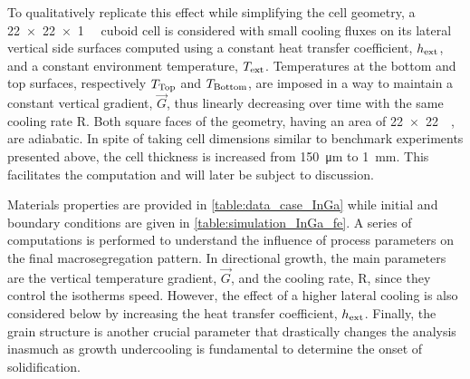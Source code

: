 To qualitatively replicate this effect while simplifying the cell geometry, a \SI{22 x 22 x 1}{\milli \uvolume}  
cuboid cell is considered with small cooling fluxes on its lateral vertical side surfaces computed using a constant heat transfer 
coefficient, $h_{\text{ext}}$, and a constant environment temperature, $T_{\text{ext}}$. Temperatures at the bottom and top surfaces, 
respectively $T_{\text{Top}}$  and $T_{\text{Bottom}}$, are imposed in a way to maintain a constant vertical gradient, $\vec{G}$, thus linearly 
decreasing over time with the same cooling rate R. Both square faces of the geometry, having an area of \SI{22 x 22}{\milli \uarea}, 
are adiabatic. In spite of taking cell dimensions similar to benchmark experiments presented above, the cell thickness 
is increased from \SI{150}{\micro \metre} to \SI{1}{\milli \metre}. This facilitates the computation and will later be subject to discussion. 

\begin{table}[htbp]
\centering
\caption{Summary of the simulations and and the corresponding parameters for the FE cases, where a purely macroscopic model is used.
Parameters are varied from (G1) low to (G2) high gradient and (L0) no, to (L1) low lateral cooling.}
\label{table:simulation_InGa_fe}
\end{table}


Materials properties are provided in \cref{table:data_case_InGa} while initial and boundary conditions are given in \cref{table:simulation_InGa_fe}. 
A series of computations is performed to understand the influence of process parameters on the final macrosegregation pattern. 
In directional growth, the main parameters are the vertical temperature gradient, $\vec{G}$, and the cooling rate, R, since they control the isotherms 
speed. However, the effect of a higher lateral cooling is also considered below by increasing the heat transfer coefficient,
$h_{\text{ext}}$. Finally, the grain structure is another crucial parameter that drastically changes the analysis inasmuch as growth 
undercooling is fundamental to determine the onset of solidification. 

